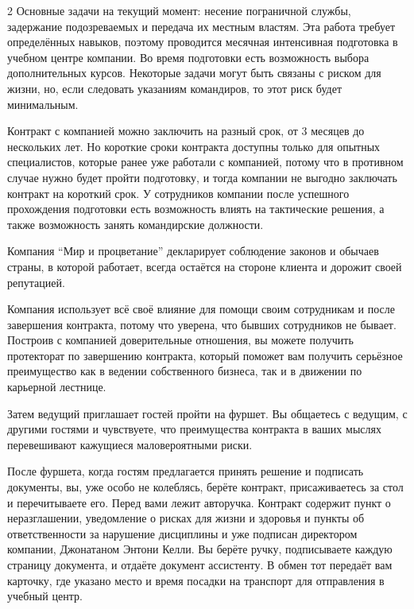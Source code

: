 \documentclass{article}
\begin{document}
\begin{multicols}{2}
Основные задачи на текущий момент: несение пограничной службы, задержание подозреваемых и передача их местным властям. Эта работа требует определённых навыков, поэтому проводится месячная интенсивная подготовка в учебном центре компании. Во время подготовки есть возможность выбора дополнительных курсов. Некоторые задачи могут быть связаны с риском для жизни, но, если следовать указаниям командиров, то этот риск будет минимальным.

Контракт с компанией можно заключить на разный срок, от 3 месяцев до нескольких лет. Но короткие сроки контракта доступны только для опытных специалистов, которые ранее уже работали с компанией, потому что в противном случае нужно будет пройти подготовку, и тогда компании не выгодно заключать контракт на короткий срок. У сотрудников компании после успешного прохождения подготовки есть возможность влиять на тактические решения, а также возможность занять командирские должности.

Компания ``Мир и процветание'' декларирует соблюдение законов и обычаев страны, в которой работает, всегда остаётся на стороне клиента и дорожит своей репутацией.

Компания использует всё своё влияние для помощи своим сотрудникам и после завершения контракта, потому что уверена, что бывших сотрудников не бывает. Построив с компанией доверительные отношения, вы можете получить протекторат по завершению контракта, который поможет вам получить серьёзное преимущество как в ведении собственного бизнеса, так и в движении по карьерной лестнице.

Затем ведущий приглашает гостей пройти на фуршет. Вы общаетесь с ведущим, с другими гостями и чувствуете, что преимущества контракта в ваших мыслях перевешивают кажущиеся маловероятными риски.

После фуршета, когда гостям предлагается принять решение и подписать документы, вы, уже особо не колеблясь, берёте контракт, присаживаетесь за стол и перечитываете его. Перед вами лежит авторучка. Контракт содержит пункт о неразглашении, уведомление о рисках для жизни и здоровья и пункты об ответственности за нарушение дисциплины и уже подписан директором компании, Джонатаном Энтони Келли. Вы берёте ручку, подписываете каждую страницу документа, и отдаёте документ ассистенту. В обмен тот передаёт вам карточку, где указано место и время посадки на транспорт для отправления в учебный центр.

\end{multicols}

\clearpage
\end{document}
